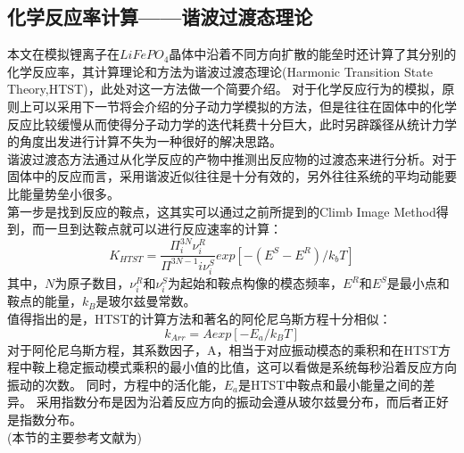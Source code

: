 \subsection{化学反应率计算——谐波过渡态理论}
本文在模拟锂离子在$LiFePO_4$晶体中沿着不同方向扩散的能垒时还计算了其分别的化学反应率，其计算理论和方法为谐波过渡态理论(Harmonic Transition State Theory,HTST)，此处对这一方法做一个简要介绍。
对于化学反应行为的模拟，原则上可以采用下一节将会介绍的分子动力学模拟的方法，但是往往在固体中的化学反应比较缓慢从而使得分子动力学的迭代耗费十分巨大，此时另辟蹊径从统计力学的角度出发进行计算不失为一种很好的解决思路。\\
\indent 谐波过渡态方法通过从化学反应的产物中推测出反应物的过渡态来进行分析。对于固体中的反应而言，采用谐波近似往往是十分有效的，另外往往系统的平均动能要比能量势垒小很多。\\
\indent 第一步是找到反应的鞍点，这其实可以通过之前所提到的Climb Image Method得到，而一旦到达鞍点就可以进行反应速率的计算：
\begin{equation}
K_{HTST} = \frac{\Pi^{3N}_{i} \nu^R_i}{\Pi^{3N-1}{i} \nu^S_i} exp \left[-(E^S -E^R)/k_bT\right]
\end{equation}
其中，$N$为原子数目，$\nu^R_i$和$\nu^S_i$为起始和鞍点构像的模态频率，$E^R$和$E^S$是最小点和鞍点的能量，$k_B$是玻尔兹曼常数。\\
值得指出的是，HTST的计算方法和著名的阿伦尼乌斯方程十分相似：
\begin{equation}
k_{Arr} = A exp\left[-E_a/k_BT\right]
\end{equation}
对于阿伦尼乌斯方程，其系数因子，A，相当于对应振动模态的乘积和在HTST方程中鞍上稳定振动模式乘积的最小值的比值，这可以看做是系统每秒沿着反应方向振动的次数。 同时，方程中的活化能，$E_a$是HTST中鞍点和最小能量之间的差异。 采用指数分布是因为沿着反应方向的振动会遵从玻尔兹曼分布，而后者正好是指数分布。\\
(本节的主要参考文献为\cite{Vineyard1957Frequency,Eyring1935The,Voter1984Transition})
